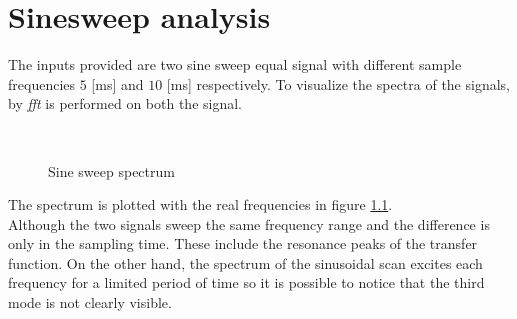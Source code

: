\chapter{Sinesweep analysis}\label{chap:sinesweep}
The inputs provided are two sine sweep equal signal with different sample
frequencies \(5\) [\si{\milli\second}] and \(10\) [\si{\milli\second}] 
respectively.
To visualize the spectra of the signals, by \emph{fft} is performed on both the
signal.
\begin{figure}[htb]
	\centering
		\,
	\caption{Sine sweep spectrum}
	\label{fig:spectral}
\end{figure}
The spectrum is plotted with the real frequencies in figure \ref{fig:spectral}.\\
Although the two signals sweep the same frequency range and the difference is
only in the sampling time. These include the resonance peaks of the transfer
function.
On the other hand, the spectrum of the sinusoidal scan excites each frequency
for a limited period of time so it is possible to notice that the third mode is
not clearly visible.
